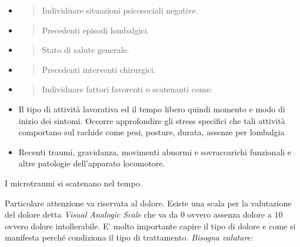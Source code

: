 \documentclass[]{article}
\begin{document}
\begin{itemize}
\item
  \begin{quote}
  Individuare situazioni psicosociali negative.
  \end{quote}
\end{itemize}

\begin{itemize}
\item
  \begin{quote}
  Precedenti episodi lombalgici.
  \end{quote}
\end{itemize}

\begin{itemize}
\item
  \begin{quote}
  Stato di salute generale.
  \end{quote}
\end{itemize}

\begin{itemize}
\item
  \begin{quote}
  Precedenti interventi chirurgici.
  \end{quote}
\end{itemize}

\begin{itemize}
\item
  \begin{quote}
  Individuare fattori favorenti o scatenanti come:
  \end{quote}
\end{itemize}

\begin{itemize}
\item
  Il tipo di attività lavorativa ed il tempo libero quindi momento e
  modo di inizio dei sintomi. Occorre approfondire gli stress specifici
  che tali attività comportano sul rachide come pesi, posture, durata,
  assenze per lombalgia
\item
  Recenti traumi, gravidanza, movimenti abnormi e sovraccarichi
  funzionali e altre patologie dell'apparato locomotore.
\end{itemize}

I microtraumi si scatenano nel tempo.

Particolare attenzione va riservata al dolore. Esiste una scala per la
valutazione del dolore detta \emph{\emph{Visual Analogic Scale}} che va
da 0 ovvero assenza dolore a 10 ovvero dolore intollerabile. E' molto
importante capire il tipo di dolore e come si manifesta perché
condiziona il tipo di trattamento. \emph{Bisogna valutare:}
\end{document}
